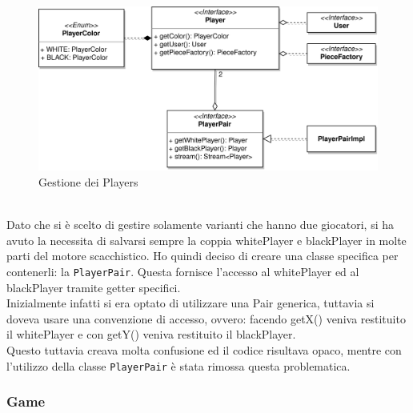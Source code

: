 \documentclass[a4paper,12pt]{report}
\begin{document}
\paragraph{}

%
\begin{figure}[H]
    \begin{center}
        \centering
        \includegraphics[width=\textwidth]{img/Alessandro/players.png}
    \end{center}
    \caption{Gestione dei Players}
    \label{img:players}
\end{figure}
%
\
\\
Dato che si è scelto di gestire solamente varianti che hanno due giocatori, si ha avuto la necessita di salvarsi sempre la coppia whitePlayer e blackPlayer in molte parti del motore scacchistico. Ho quindi deciso di creare una classe specifica per contenerli: la \texttt{PlayerPair}. Questa fornisce l'accesso al whitePlayer ed al blackPlayer tramite getter specifici.
\\
Inizialmente infatti si era optato di utilizzare una Pair generica, tuttavia si doveva usare una convenzione di accesso, ovvero: facendo getX() veniva restituito il whitePlayer e con getY() veniva restituito il blackPlayer.
\\
Questo tuttavia creava molta confusione ed il codice risultava opaco, mentre con l'utilizzo della classe \texttt{PlayerPair} è stata rimossa questa problematica.

\subsubsection{Game}
\label{Game}
\end{document}
